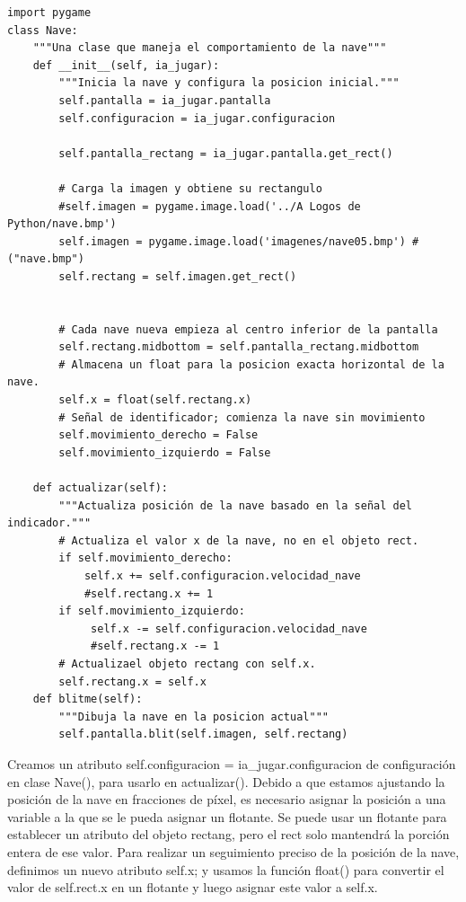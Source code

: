 \hspace{-2.0cm}{\ttfamily \scriptsize nave.py}  \vspace{-0.5cm}
\begin{lstlisting}
import pygame
class Nave:
    """Una clase que maneja el comportamiento de la nave"""
    def __init__(self, ia_jugar):
        """Inicia la nave y configura la posicion inicial."""
        self.pantalla = ia_jugar.pantalla
        self.configuracion = ia_jugar.configuracion
        
        self.pantalla_rectang = ia_jugar.pantalla.get_rect()

        # Carga la imagen y obtiene su rectangulo
        #self.imagen = pygame.image.load('../A Logos de Python/nave.bmp')   
        self.imagen = pygame.image.load('imagenes/nave05.bmp') #("nave.bmp")
        self.rectang = self.imagen.get_rect()        
            

        # Cada nave nueva empieza al centro inferior de la pantalla
        self.rectang.midbottom = self.pantalla_rectang.midbottom 
        # Almacena un float para la posicion exacta horizontal de la nave.
        self.x = float(self.rectang.x)           
        # Señal de identificador; comienza la nave sin movimiento
        self.movimiento_derecho = False
        self.movimiento_izquierdo = False

    def actualizar(self):
        """Actualiza posición de la nave basado en la señal del indicador."""
        # Actualiza el valor x de la nave, no en el objeto rect.
        if self.movimiento_derecho:
            self.x += self.configuracion.velocidad_nave
            #self.rectang.x += 1
        if self.movimiento_izquierdo:
             self.x -= self.configuracion.velocidad_nave
             #self.rectang.x -= 1	
        # Actualizael objeto rectang con self.x.
        self.rectang.x = self.x
    def blitme(self):
        """Dibuja la nave en la posicion actual"""
        self.pantalla.blit(self.imagen, self.rectang)
\end{lstlisting}

Creamos un atributo {\ttfamily self.configuracion = ia\_jugar.configuracion} de configuración en clase {\ttfamily Nave()}, 
para usarlo en {\ttfamily actualizar()}. Debido a que estamos ajustando la posición de la nave en fracciones de píxel,
es necesario asignar la posición a una variable a la que se le pueda asignar un flotante. Se puede usar un flotante para establecer 
un atributo del objeto  {\ttfamily rectang}, pero el {\ttfamily rect} solo mantendrá la porción entera de ese valor. 
Para realizar un seguimiento preciso de la posición de la nave,  definimos un nuevo atributo {\ttfamily self.x}; y usamos la función {\ttfamily float()} para convertir el valor de {\ttfamily self.rect.x} en un flotante y luego asignar este valor a  {\ttfamily self.x}. 

